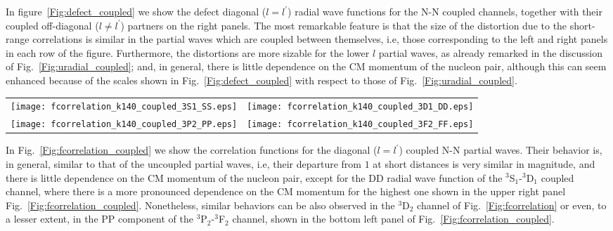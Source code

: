 \documentclass[aps,twocolumn,showpacs,preprintnumbers,amsmath,amssymb,nofootinbib,superscriptaddress,showkeys,noeprint]{revtex4-1}
\begin{document}
In figure~\ref{Fig:defect_coupled} we show the defect diagonal
($l=l^\prime$) radial wave functions for the N-N coupled channels,
together with their coupled off-diagonal ($l\ne l^\prime$) partners on
the right panels. The most remarkable feature is that the size of the
distortion due to the short-range correlations is similar in the
partial waves which are coupled between themselves, i.e, those
corresponding to the left and right panels in each row of the
figure. Furthermore, the distortions are more sizable for the lower
$l$ partial waves, as already remarked in the discussion of
Fig.~\ref{Fig:uradial_coupled}; and, in general, there is little
dependence on the CM momentum of the nucleon pair, although this can
seem enhanced because of the scales shown in
Fig.~\ref{Fig:defect_coupled} with respect to those of
Fig.~\ref{Fig:uradial_coupled}.


\begin{figure*}[!ht]
\begin{tabular}{cc}
\texttt{[image: fcorrelation\_k140\_coupled\_3S1\_SS.eps]}&
\texttt{[image: fcorrelation\_k140\_coupled\_3D1\_DD.eps]}\\
\texttt{[image: fcorrelation\_k140\_coupled\_3P2\_PP.eps]}&
\texttt{[image: fcorrelation\_k140\_coupled\_3F2\_FF.eps]}\\
\end{tabular}
\caption{Correlation functions $f_{\rm corr}(r)$ for the diagonal
  ($l=l^\prime$) wave functions, whose trend when $r\rightarrow\infty$
  should be $1$, for the coupled N-N partial waves
  ${}^{3}$S$_1$-${}^{3}$D$_1$ and ${}^{3}$P$_2$-${}^{3}$F$_2$. The
  results are given for relative momentum $k=140$ MeV/c and for the
  same values of the CM momentum as in Figs.~\ref{Fig:uradial_coupled}
  and \ref{Fig:defect_coupled}.}
\label{Fig:fcorrelation_coupled}
\end{figure*}

In Fig.~\ref{Fig:fcorrelation_coupled} we show the correlation
functions for the diagonal ($l=l^\prime$) coupled N-N partial waves.
Their behavior is, in general, similar to that of the uncoupled
partial waves, i.e, their departure from $1$ at short distances is
very similar in magnitude, and there is little dependence on the CM
momentum of the nucleon pair, except for the DD radial wave function
of the ${}^3$S$_1$-${}^3$D$_1$ coupled channel, where there is a more
pronounced dependence on the CM momentum for the highest one shown in
the upper right panel Fig.~\ref{Fig:fcorrelation_coupled}.
Nonetheless, similar behaviors can be also observed in the ${}^3$D$_2$
channel of Fig.~\ref{Fig:fcorrelation} or even, to a lesser extent, in
the PP component of the ${}^3$P$_2$-${}^3$F$_2$ channel, shown in the
bottom left panel of Fig.~\ref{Fig:fcorrelation_coupled}.
\end{document}
